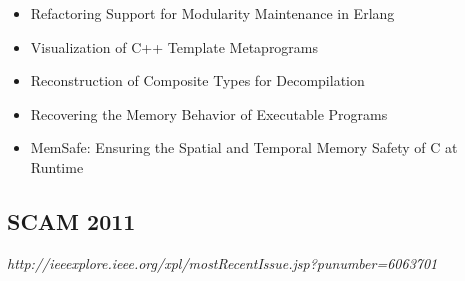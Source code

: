 {\begin{itemize}[itemsep=-1ex]
  \item Refactoring Support for Modularity Maintenance in Erlang {\color{blue} \checkmark}{\color{red} \texttimes}
  \item Visualization of C++ Template Metaprograms {\color{blue} \checkmark}{\color{red} \texttimes}
  \item Reconstruction of Composite Types for Decompilation {\color{blue} \checkmark}{\color{red} \texttimes}
  \item Recovering the Memory Behavior of Executable Programs {\color{blue} \checkmark}{\color{red} \texttimes}
  \item MemSafe: Ensuring the Spatial and Temporal Memory Safety of C at Runtime {\color{blue} \checkmark}{\color{red} \texttimes}
\end{itemize}
}

\subsection{SCAM 2011}

{\small \em http://ieeexplore.ieee.org/xpl/mostRecentIssue.jsp?punumber=6063701}

